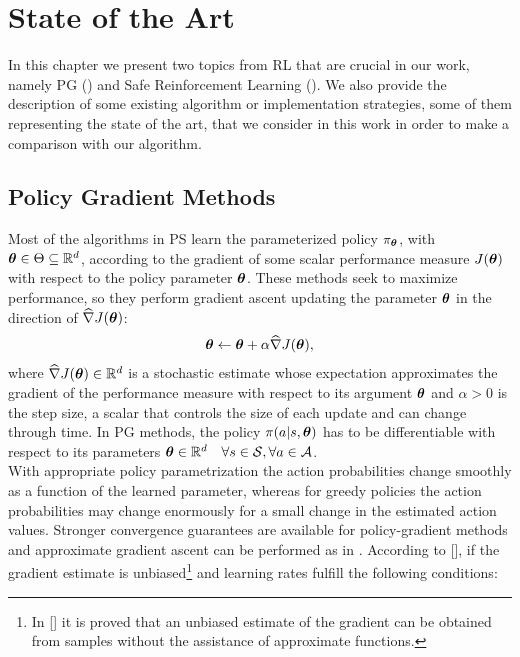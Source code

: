 \chapter{State of the Art} \label{chap:state}
In this chapter we present two topics from \ac{RL} that are crucial in our work, namely \acf{PG} () and Safe Reinforcement Learning (). We also provide the description of some existing algorithm or implementation strategies, some of them representing the state of the art, that we consider in this work in order to make a comparison with our algorithm.

\section{Policy Gradient Methods} \label{sec:pg}
Most of the algorithms in \ac{PS} learn the parameterized policy $\pi_{\boldsymbol{\theta}}$, with $\boldsymbol{\theta} \in \Theta \subseteq \mathbb{R}^d$, according to the gradient of some scalar performance measure $J(\boldsymbol{\theta})$ with respect to the policy parameter $\boldsymbol{\theta}$. These methods seek to maximize performance, so they perform gradient ascent updating the parameter $\boldsymbol{\theta}$ in the direction of $\widehat{\nabla}J(\boldsymbol{\theta})$:
\begin{align}
\boldsymbol{\theta} \leftarrow \boldsymbol{\theta} + \alpha \widehat{\nabla}J(\boldsymbol{\theta}), \label{eq:grad}
\end{align}
where $\widehat{\nabla}J(\boldsymbol{\theta}) \in \mathbb{R}^d$ is a stochastic estimate whose expectation approximates the gradient of the performance measure with respect to its argument $\boldsymbol{\theta}$ and $\alpha>0$ is the step size, a scalar that controls the size of each update and can change through time. In \ac{PG} methods, the policy $\pi(a|s,\boldsymbol{\theta})$ has to be differentiable with respect to its parameters $\boldsymbol{\theta} \in \mathbb{R}^d \quad \forall s \in \mathcal{S}, \forall a \in \mathcal{A}$.\\
\newline
With appropriate policy parametrization the action probabilities change smoothly as a function of the learned parameter, whereas for greedy policies the action probabilities may change enormously for a small change in the estimated action values. Stronger convergence guarantees are available for policy-gradient methods and approximate gradient ascent can be performed as in . According to [\cite{peters2010pg}], if the gradient estimate is unbiased\footnote{In [\cite{williams1992simple}] it is proved that an unbiased estimate of the gradient can be obtained from samples without the assistance of approximate functions.} and learning rates fulfill the following conditions:
